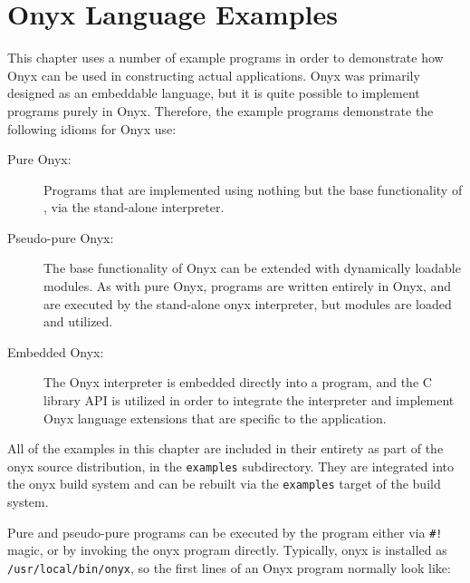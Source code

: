 %
%
%
%
%

\clearemptydoublepage
\chapter{Onyx Language Examples}
\label{onyxex}

This chapter uses a number of example programs in order to demonstrate how Onyx
can be used in constructing actual applications.  Onyx was primarily designed as
an embeddable language, but it is quite possible to implement programs purely in
Onyx.  Therefore, the example programs demonstrate the following idioms for Onyx
use:

\begin{description}
\item[Pure Onyx: ] Programs that are implemented using nothing but the base
  functionality of , via the stand-alone
   interpreter.
\item[Pseudo-pure Onyx: ] The base functionality of Onyx can be extended with
  dynamically loadable modules.  As with pure Onyx, programs are written
  entirely in Onyx, and are executed by the stand-alone onyx interpreter, but
  modules are loaded and utilized.
\item[Embedded Onyx: ] The Onyx interpreter is embedded directly into a program,
  and the  C library API is utilized in order to
  integrate the interpreter and implement Onyx language extensions that are
  specific to the application.
\end{description}

All of the examples in this chapter are included in their entirety as part of
the onyx source distribution, in the {\tt examples} subdirectory.  They are
integrated into the onyx build system and can be rebuilt via the {\tt examples}
target of the build system.

Pure and pseudo-pure programs can be executed by the 
program either via {\tt \#!} magic, or by invoking the onyx program directly.
Typically, onyx is installed as {\tt /usr/local/bin/onyx}, so the first lines of
an Onyx program normally look like:

